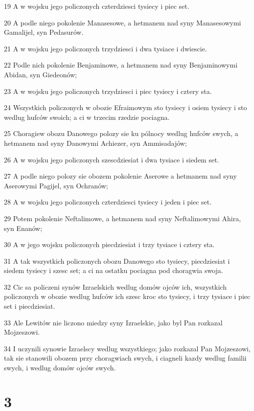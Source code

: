 \par 19 A w wojsku jego policzonych czterdziesci tysiecy i piec set.
\par 20 A podle niego pokolenie Manasesowe, a hetmanem nad syny Manasesowymi Gamalijel, syn Pedasurów.
\par 21 A w wojsku jego policzonych trzydziesci i dwa tysiace i dwiescie.
\par 22 Podle nich pokolenie Benjaminowe, a hetmanem nad syny Benjaminowymi Abidan, syn Giedeonów;
\par 23 A w wojsku jego policzonych trzydziesci i piec tysiecy i cztery sta.
\par 24 Wszystkich policzonych w obozie Efraimowym sto tysiecy i osiem tysiecy i sto wedlug hufców swoich; a ci w trzecim rzedzie pociagna.
\par 25 Choragiew obozu Danowego polozy sie ku pólnocy wedlug hufców swych, a hetmanem nad syny Danowymi Achiezer, syn Ammisadajów;
\par 26 A w wojsku jego policzonych szescdziesiat i dwa tysiace i siedem set.
\par 27 A podle niego polozy sie obozem pokolenie Aserowe a hetmanem nad syny Aserowymi Pagijel, syn Ochranów;
\par 28 A w wojsku jego policzonych czterdziesci tysiecy i jeden i piec set.
\par 29 Potem pokolenie Neftalimowe, a hetmanem nad syny Neftalimowymi Ahira, syn Enanów;
\par 30 A w jego wojsku policzonych piecdziesiat i trzy tysiace i cztery sta.
\par 31 A tak wszystkich policzonych obozu Danowego sto tysiecy, piecdziesiat i siedem tysiecy i szesc set; a ci na ostatku pociagna pod choragwia swoja.
\par 32 Cic sa policzeni synów Izraelskich wedlug domów ojców ich, wszystkich policzonych w obozie wedlug hufców ich szesc kroc sto tysiecy, i trzy tysiace i piec set i piecdziesiat.
\par 33 Ale Lewitów nie liczono miedzy syny Izraelskie, jako byl Pan rozkazal Mojzeszowi.
\par 34 I uczynili synowie Izraelscy wedlug wszystkiego; jako rozkazal Pan Mojzeszowi, tak sie stanowili obozem przy choragwiach swych, i ciagneli kazdy wedlug familii swych, i wedlug domów ojców swych.

\chapter{3}

